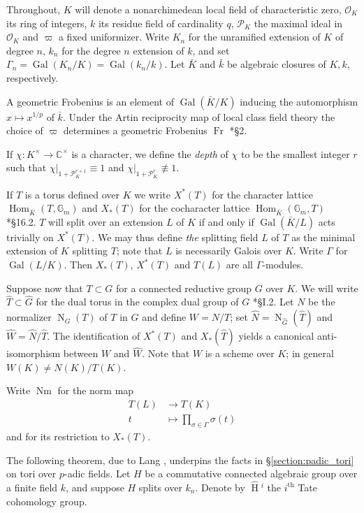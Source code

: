 \documentclass{mrlart7}
\theoremstyle{plain}
\newcommand{\HT}[1]{\hat{\HH}{}^{#1}}
\theoremstyle{definition}
\numberwithin{equation}{section}
\DeclareMathOperator{\Gal}{Gal}
\DeclareMathOperator{\HH}{H}
\DeclareMathOperator{\Nm}{Nm}
\DeclareMathOperator{\Hom}{Hom}
\DeclareMathOperator{\Fr}{Fr}
\newcommand{\OK}{\mathcal{O}_K}
\newcommand{\PK}{\mathcal{P}_K}
\newcommand{\Gm}{\mathbb{G}_m}
\newcommand{\Normalizer}[2]{\operatorname{N}_{#2}(#1)}
\begin{document}
Throughout, $K$ will denote a nonarchimedean local field of
characteristic zero, $\OK$ its ring of integers, $k$ its residue field of cardinality $q$,
$\PK$ the maximal ideal in $\OK$ and $\varpi$ a fixed uniformizer.
Write $K_n$ for the unramified extension of $K$ of degree $n$, $k_n$ for
the degree $n$ extension of $k$,
and set $\Gamma_n = \Gal(K_n/K) = \Gal(k_n/k)$. Let $\bar{K}$ and $\bar{k}$ be algebraic closures of $K, k$, respectively.

A geometric Frobenius is an element of $\Gal(\bar{K}/K)$
inducing the automorphism $x \mapsto x^{1/p}$ of $\bar{k}$.  Under the
Artin reciprocity map of local class field theory the choice of $\varpi$
determines a geometric Frobenius $\Fr$ \cite{serre:LocalClassFieldThy}*{\S 2}.

If $\chi : K^{\times} \rightarrow \mathbb{C}^{\times}$ is a character, we define
the \emph{depth} of $\chi$ to be the smallest integer $r$ such that
$\chi|_{1 + \PK^{r+1}} \equiv 1$ and
$\chi|_{1 + \PK^{r}} \not\equiv 1$.

If $T$ is a torus defined over $K$ we write $X^*(T)$
for the character lattice $\Hom_{\bar{K}}(T, \Gm)$ and $X_*(T)$ for the
cocharacter lattice $\Hom_{\bar{K}}(\Gm, T)$ \cite{humphreys:LinAlgGrps}*{\S 16.2}.
$T$ will split over an extension
$L$ of $K$ if and only if $\Gal(\bar{K}/L)$ acts trivially on $X^*(T)$.
We may thus define \emph{the} splitting field $L$ of $T$ as the
minimal extension of $K$ splitting $T$; note that $L$ is necessarily
Galois over $K$.  Write $\Gamma$ for $\Gal(L/K)$. Then $X_*(T)$, $X^*(T)$ and $T(L)$
are all $\Gamma$-modules.

Suppose now that $T \subset G$ for a connected reductive group $G$ over $K$.
We will write $\hat{T} \subset \hat{G}$ for the dual torus in the complex dual group of $G$ \cite{borel:79a}*{\S I.2}.
Let $N$ be the normalizer $\Normalizer{T}{G}$ of $T$ in $G$ and define $W = N/T$;
set $\hat{N} = \Normalizer{\hat{T}}{\hat{G}}$ and
$\hat{W} = \hat{N}/\hat{T}$.  The identification of $X^*(T)$ and $X_*(\hat{T})$
yields a canonical anti-isomorphism between $W$ and $\hat{W}$.
Note that $W$ is a scheme over $K$; in general $W(K) \ne N(K) / T(K)$.

Write $\Nm$ for the norm map
\begin{align*}
T(L) &\rightarrow T(K) \\
t &\mapsto \prod_{\sigma \in \Gamma} \sigma(t)
\end{align*}
and for its restriction to $X_*(T)$.

The following theorem, due to Lang \cite{lang:56a}, underpins the facts in
\S\ref{section:padic_tori} on tori over $p$-adic fields.
Let $H$ be a commutative connected algebraic group over a
finite field $k$, and suppose $H$ splits over $k_n$.  Denote by $\HT{i}$ the $i^{\mathrm{th}}$
Tate cohomology group.
\end{document}
